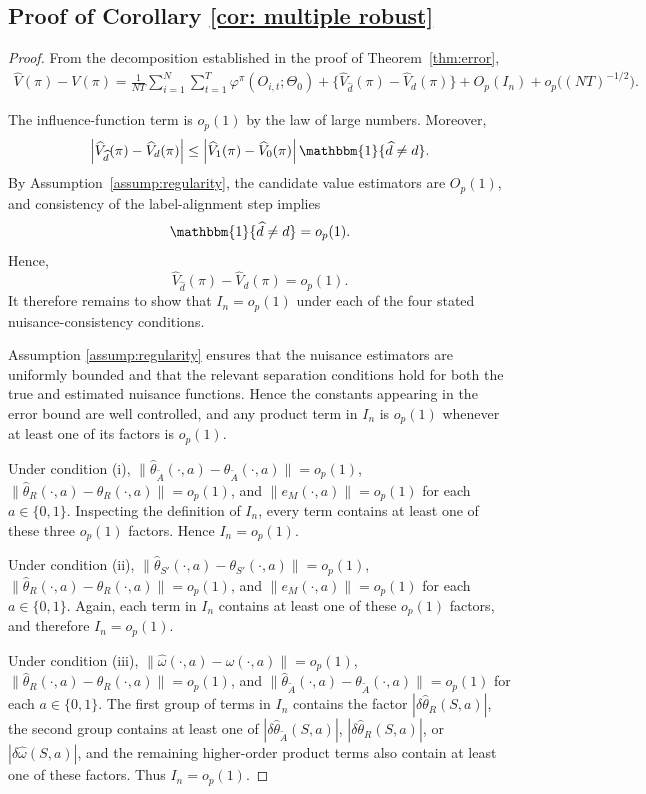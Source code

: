 \documentclass[12pt]{article}
\newcommand{\0}{\boldsymbol{0}}
\begin{document}
\subsection{Proof of Corollary \ref{cor: multiple robust}}
\begin{proof}
From the decomposition established in the proof of Theorem~\ref{thm:error},
\[
\begin{aligned}
\widehat V(\pi)-V(\pi)=\frac{1}{NT}\sum_{i=1}^{N}\sum_{t=1}^{T}\varphi^\pi(O_{i,t};\Theta_0) 
+\bigl\{\widehat V_{\widehat d}(\pi)-\widehat V_d(\pi)\bigr\}+O_p(I_n)+o_p\bigl((NT)^{-1/2}\bigr).
\end{aligned}
\]

The influence-function term is \(o_p(1)\) by the law of large
numbers. Moreover,
\[
\left|\widehat V_{\widehat d}(\pi)-\widehat V_d(\pi)\right|\le\left|\widehat V_1(\pi)-\widehat V_0(\pi)\right|\mathbbm{1}\{\widehat d\neq d\}.
\]
By Assumption~\ref{assump:regularity}, the candidate value estimators are \(O_p(1)\), and consistency of the label-alignment step implies
\[
\mathbbm{1}\{\widehat d\neq d\}=o_p(1).
\]
Hence,
\[
\widehat V_{\widehat d}(\pi)-\widehat V_d(\pi)=o_p(1).
\]
It therefore remains to show that \(I_n=o_p(1)\) under each of the four
stated nuisance-consistency conditions.

Assumption \ref{assump:regularity} ensures that the nuisance estimators are uniformly bounded and that the relevant separation conditions hold for both the true and estimated nuisance functions. Hence the constants appearing in the error bound are well controlled, and any product term in $I_n$ is $o_p(1)$ whenever at least one of its factors is $o_p(1)$.

Under condition (i), $\|\widehat\theta_{\widetilde A}(\cdot,a) -\theta_{\widetilde A}(\cdot,a)\|=o_p(1)$, $\|\widehat\theta_R(\cdot,a)-\theta_R(\cdot,a)\|=o_p(1)$, and $\|e_M(\cdot,a)\|=o_p(1)$ for each $a\in\{0,1\}$. Inspecting the definition of $I_n$, every term contains at least one of these three $o_p(1)$ factors. Hence $I_n=o_p(1)$.

Under condition (ii), $\|\widehat\theta_{S'}(\cdot,a) -\theta_{S'}(\cdot,a)\|=o_p(1)$,
$\|\widehat\theta_R(\cdot,a)-\theta_R(\cdot,a)\|=o_p(1)$, and $\|e_M(\cdot,a)\|=o_p(1)$ for each $a\in\{0,1\}$. Again, each term in $I_n$ contains at least one of these $o_p(1)$ factors, and therefore $I_n=o_p(1)$.

Under condition (iii), $\|\widehat\omega(\cdot,a)-\omega(\cdot,a)\|=o_p(1)$, $\|\widehat\theta_R(\cdot,a)-\theta_R(\cdot,a)\|=o_p(1)$, and $\|\widehat\theta_{\widetilde A}(\cdot,a) -\theta_{\widetilde A}(\cdot,a)\|=o_p(1)$ for each $a\in\{0,1\}$.
The first group of terms in $I_n$ contains the factor $|\delta\widehat\theta_R(S,a)|$, the second group contains at least one of $|\delta\widehat\theta_{\widetilde A}(S,a)|$, $|\delta\widehat\theta_R(S,a)|$, or $|\delta\widehat\omega(S,a)|$, and the remaining higher-order product terms also contain at least one of these factors. Thus $I_n=o_p(1)$.


\end{proof}
\end{document}
